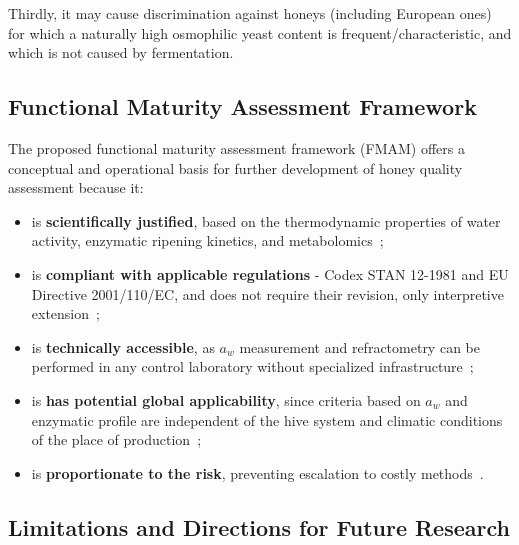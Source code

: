 Thirdly, it may cause discrimination against honeys (including
European ones) for which a naturally high osmophilic yeast content
is frequent/characteristic, and which is not caused by fermentation.

\subsection{Functional Maturity Assessment Framework}

The proposed functional maturity assessment framework (FMAM) offers a conceptual and operational basis for further development of honey quality assessment because it:

\begin{itemize}
    \item is \textbf{scientifically justified}, based on the
          thermodynamic properties of water activity, enzymatic
          ripening kinetics, and
          metabolomics~\cite{ruegg1981,zhang2021,guo2020};
    \item is \textbf{compliant with applicable regulations}
          - Codex STAN 12-1981 and EU Directive 2001/110/EC,
          and does not require their revision, only interpretive
          extension~\cite{codex_stan12,eudir2001110};
    \item is \textbf{technically accessible}, as $a_w$ measurement
          and refractometry can be performed in any control
          laboratory without specialized
          infrastructure~\cite{waaw2006,zamora2006};
    \item is \textbf{has potential global applicability}, since criteria based
          on $a_w$ and enzymatic profile are independent of the
          hive system and climatic conditions of the place of
          production~\cite{tadele2025,stinglessyeastbrazil2021};
    \item is \textbf{proportionate to the risk}, preventing
          escalation to costly
          methods~\cite{schoder2026,nmrhoney2023}.
\end{itemize}

\subsection{Limitations and Directions for Future Research}

